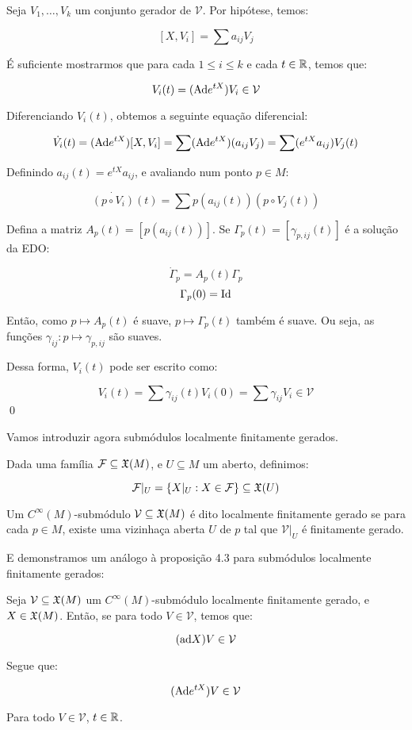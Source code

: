 \dem Seja $V_1, \dots, V_k$ um conjunto gerador de $\mathcal{V}$. Por hipótese, temos:

$$[X,V_i] = \sum a_{ij} V_j$$

É suficiente mostrarmos que para cada $1 \leq i \leq k$ e cada $t \in \mathbb{R}$,
temos que:

$$V_i(t) = (\text{Ad} e^{tX}) V_i \in \mathcal{V}$$

Diferenciando $V_i(t)$, obtemos a seguinte equação diferencial:

$$\dot{V_i}(t) = (\text{Ad} e^{tX}) [X,V_i] = \sum (\text{Ad} e^{tX}) (a_{ij} V_j)
= \sum (e^{tX} a_{ij}) V_j(t)$$

Definindo $a_{ij}(t) = e^{tX} a_{ij}$, e avaliando num ponto $p \in M$:

$$\dot{(p\circ V_i)}(t) = \sum p(a_{ij}(t))(p \circ V_j(t))$$

Defina a matriz $A_p(t) = [p(a_{ij}(t))]$. Se $\Gamma_p(t) = [\gamma_{p,ij}(t)]$
é a solução da EDO:

$$\dot{\Gamma}_p = A_p(t) \Gamma_p$$
$$\Gamma_p(0) = \text{Id}$$

Então, como $p \mapsto A_p(t)$ é suave, $p \mapsto \Gamma_p(t)$ também é suave.
Ou seja, as funções $\gamma_{ij} : p \mapsto \gamma_{p,ij}$ são suaves.

Dessa forma, $V_i(t)$ pode ser escrito como:

$$V_i(t) = \sum \gamma_{ij}(t) V_i(0) = \sum \gamma_{ij} V_i \in \mathcal{V}$$ \qed

Vamos introduzir agora submódulos localmente finitamente gerados.

\begin{definition}
    Dada uma família $\mathcal{F} \subseteq \mathfrak{X}(M)$, e $U \subseteq M$ um aberto,
    definimos:

    $$\mathcal{F}|_U = \{X|_U : X \in \mathcal{F}\} \subseteq \mathfrak{X}(U)$$
\end{definition}

\begin{definition}
    Um $C^\infty(M)$-submódulo $\mathcal{V}\subseteq \mathfrak{X}(M)$ é dito localmente
    finitamente
    gerado se para cada $p \in M$, existe uma vizinhaça aberta $U$ de $p$
    tal que $\mathcal{V}|_U$ é finitamente gerado.
\end{definition}

E demonstramos um análogo à proposição 4.3 para submódulos localmente finitamente gerados:

\begin{proposition}
    Seja $\mathcal{V}\subseteq \mathfrak{X}(M)$ um $C^\infty(M)$-submódulo
    localmente finitamente gerado, e $X \in \mathfrak{X}(M)$. Então,
    se para todo $V \in \mathcal{V}$, temos que:

    $$(\text{ad} X)V \in \mathcal{V}$$

    Segue que:

    $$(\text{Ad} e^{tX})V \in \mathcal{V}$$

    Para todo $V \in \mathcal{V}$, $t \in \mathbb{R}$.
\end{proposition}

